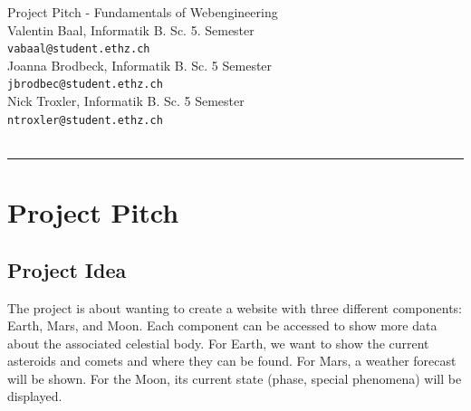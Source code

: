 \documentclass{article}
\begin{document}
\begin{titlepage}
    \thispagestyle{fancy}
    \renewcommand{\headrulewidth}{1pt}

    \center
    \vspace*{1.0cm}
    \Large Project Pitch - Fundamentals of Webengineering \\[.5 cm]
    \large
    \normalsize
    Valentin Baal, Informatik B. Sc. 5. Semester \\
    \texttt{vabaal@student.ethz.ch}  \\[0.4cm]
    Joanna Brodbeck, Informatik B. Sc. 5 Semester \\
    \texttt{jbrodbec@student.ethz.ch}  \\[0.4cm]
    Nick Troxler, Informatik B. Sc. 5 Semester \\
    \texttt{ntroxler@student.ethz.ch}    \\ [0.4cm]
    \texttt{}\\[1cm]

    \noindent\rule{\textwidth}{0.4 pt}


    \vfill

\end{titlepage}

\section*{Project Pitch}
\subsection*{Project Idea}
The project is about wanting to create a website with three different
components: Earth, Mars, and Moon. Each component can be accessed to show more
data about the associated celestial body. For Earth, we want to show the
current asteroids and comets and where they can be found. For Mars, a weather
forecast will be shown. For the Moon, its current state (phase, special
phenomena) will be displayed.
\end{document}
